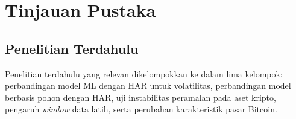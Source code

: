 \chapter{Tinjauan Pustaka}

\newenvironment{keterangan}{%
  \par\vspace{3pt}\noindent dengan:\par\nobreak
  \begin{description}[leftmargin=2.8cm,labelwidth=2.4cm,labelsep=0.4cm,
    align=left,font=\normalfont,topsep=2pt,itemsep=0pt,parsep=0pt]%
}{%
  \end{description}\par\vspace{3pt}%
}


\section{Penelitian Terdahulu}
Penelitian terdahulu yang relevan dikelompokkan ke dalam lima kelompok:
perbandingan model ML dengan HAR untuk volatilitas, perbandingan model berbasis
pohon dengan HAR, uji instabilitas peramalan pada aset kripto, pengaruh
\textit{window} data latih, serta perubahan karakteristik pasar Bitcoin.

